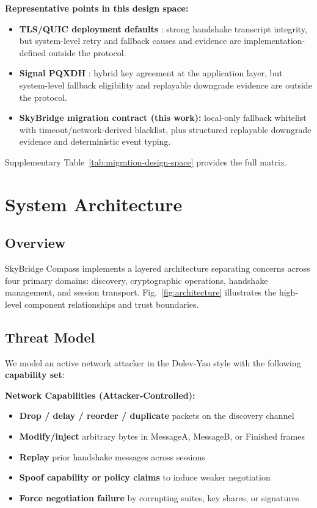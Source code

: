 \documentclass[10pt,journal,compsoc]{IEEEtran}
\providecommand{\tightlist}{%
  \setlength{\itemsep}{0pt}\setlength{\parskip}{0pt}}
\begin{document}
\textbf{Representative points in this design space:}
\begin{itemize}\tightlist
\item \textbf{TLS/QUIC deployment defaults} \cite{ref6,ref18}: strong handshake transcript integrity, but system-level retry and fallback causes and evidence are implementation-defined outside the protocol.
\item \textbf{Signal PQXDH} \cite{ref9}: hybrid key agreement at the application layer, but system-level fallback eligibility and replayable downgrade evidence are outside the protocol.
\item \textbf{SkyBridge migration contract (this work):} local-only fallback whitelist with timeout/network-derived blacklist, plus structured replayable downgrade evidence and deterministic event typing.
\end{itemize}
Supplementary Table~\ref{tab:migration-design-space} provides the full matrix.

\section{System Architecture}\label{sec:system-architecture}

\subsection{Overview}\label{a.-overview}

SkyBridge Compass implements a layered architecture separating concerns
across four primary domains: discovery, cryptographic operations,
handshake management, and session transport. Fig.~\ref{fig:architecture} illustrates the
high-level component relationships and trust boundaries.

\subsection{Threat Model}\label{a.1-threat-model}

We model an active network attacker in the Dolev-Yao style with the
following \textbf{capability set}:

\textbf{Network Capabilities (Attacker-Controlled):}
\begin{itemize}\tightlist
\item
  \textbf{Drop / delay / reorder / duplicate} packets on the discovery
  channel
\item
  \textbf{Modify/inject} arbitrary bytes in MessageA, MessageB, or
  Finished frames
\item
  \textbf{Replay} prior handshake messages across sessions
\item
  \textbf{Spoof capability or policy claims} to induce weaker
  negotiation
\item
  \textbf{Force negotiation failure} by corrupting suites, key shares,
  or signatures
\end{itemize}
\end{document}
